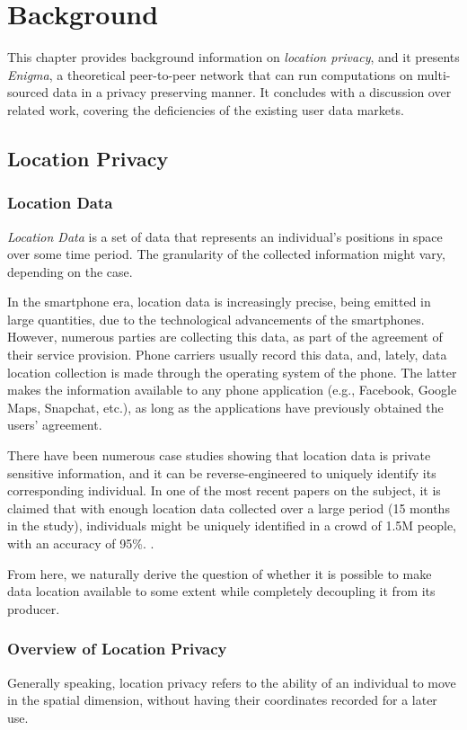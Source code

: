 \chapter{Background}
This chapter provides background information on \textit{location privacy}, and it presents \textit{Enigma}, a theoretical peer-to-peer network that can run computations on multi-sourced data in a privacy preserving manner. It concludes with a discussion over related work, covering the deficiencies of the existing user data markets.

\section{Location Privacy}
\subsection{Location Data}
\textit{Location Data} is a set of data that represents an individual's positions in space over some time period. The granularity of the collected information might vary, depending on the case. 

In the smartphone era, location data is increasingly precise, being emitted in large quantities, due to the technological advancements of the smartphones. However, numerous parties are collecting this data, as part of the agreement of their service provision. Phone carriers usually record this data, and, lately, data location collection is made through the operating system of the phone. The latter makes the information available to any phone application (e.g., Facebook, Google Maps, Snapchat, etc.), as long as the applications have previously obtained the users' agreement.

There have been numerous case studies showing that location data is private sensitive information, and it can be reverse-engineered to uniquely identify its corresponding individual. In one of the most recent papers on the subject, it is claimed that with enough location data collected over a large period (15 months in the study), individuals might be uniquely identified in a crowd of 1.5M people, with an accuracy of 95\%. \cite{datalocation}.

From here, we naturally derive the question of whether it is possible to make data location available to some extent while completely decoupling it from its producer.

\subsection{Overview of Location Privacy}
Generally speaking, location privacy refers to the ability of an individual to move in the spatial dimension, without having their coordinates recorded for a later use.

